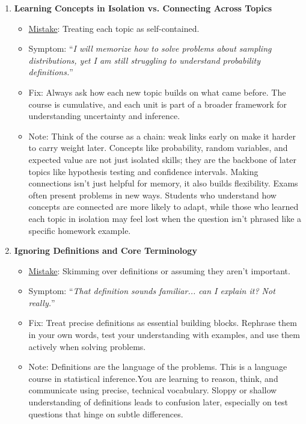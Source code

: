 \documentclass[12pt]{article}
\begin{document}
\begin{enumerate}
\item \textbf{Learning Concepts in Isolation vs. Connecting Across Topics}
\begin{itemize}
    \item \underline{Mistake}: Treating each topic as self-contained.
    \item Symptom: ``\emph{I will memorize how to solve problems about sampling distributions, yet I am still struggling to understand probability definitions.}''
    \item Fix: Always ask how each new topic builds on what came before. The course is cumulative, and each unit is part of a broader framework for understanding uncertainty and inference.
    \item Note: Think of the course as a chain: weak links early on make it harder to carry weight later. Concepts like probability, random variables, and expected value are not just isolated skills; they are the backbone of later topics like hypothesis testing and confidence intervals. Making connections isn’t just helpful for memory, it also builds flexibility. Exams often present problems in new ways. Students who understand how concepts are connected are more likely to adapt, while those who learned each topic in isolation may feel lost when the question isn’t phrased like a specific homework example.
\end{itemize}

\item \textbf{Ignoring Definitions and Core Terminology}
\begin{itemize}
    \item \underline{Mistake}: Skimming over definitions or assuming they aren't important.
    \item Symptom: ``\emph{That definition sounds familiar... can I explain it? Not really.}''
    \item Fix: Treat precise definitions as essential building blocks. Rephrase them in your own words, test your understanding with examples, and use them actively when solving problems.
    \item Note: Definitions are the language of the problems. This is a language course in statistical inference.You are learning to reason, think, and communicate using precise, technical vocabulary. Sloppy or shallow understanding of definitions leads to confusion later, especially on test questions that hinge on subtle differences.
\end{itemize}

\end{enumerate}
\end{document}
